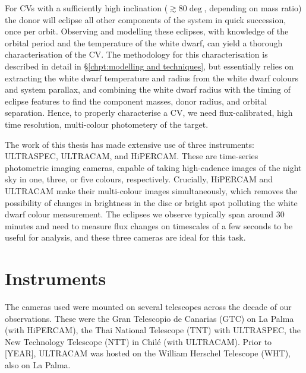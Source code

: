 
\label{chpt:observations and observational techniques} %

For CVs with a sufficiently high inclination ($\gtrsim 80 \deg$, depending on mass ratio) the donor will eclipse all other components of the system in quick succession, once per orbit. Observing and modelling these eclipses, with knowledge of the orbital period and the temperature of the white dwarf, can yield a thorough characterisation of the CV. The methodology for this characterisation is described in detail in \S\ref{chpt:modelling and techniques}, but essentially relies on extracting the white dwarf temperature and radius from the white dwarf colours and system parallax, and combining the white dwarf radius with the timing of eclipse features to find the component masses, donor radius, and orbital separation. Hence, to properly characterise a CV, we need flux-calibrated, high time resolution, multi-colour photometery of the target. 

The work of this thesis has made extensive use of three instruments: ULTRASPEC, ULTRACAM, and HiPERCAM.
These are time-series photometric imaging cameras, capable of taking high-cadence images of the night sky in one, three, or five colours, respectively. Crucially, HiPERCAM and ULTRACAM make their multi-colour images simultaneously, which removes the possibility of changes in brightness in the disc or bright spot polluting the white dwarf colour measurement. The eclipses we observe typically span around 30 minutes and need to measure flux changes on timescales of a few seconds to be useful for analysis, and these three cameras are ideal for this task.


\section{Instruments}

The cameras used were mounted on several telescopes across the decade of our observations. These were the Gran Telescopio de Canarias (GTC) on La Palma (with HiPERCAM), the Thai National Telescope (TNT) with ULTRASPEC, the New Technology Telescope (NTT) in Chil\'e (with ULTRACAM). Prior to [YEAR], ULTRACAM was hosted on the William Herschel Telescope (WHT), also on La Palma. 


